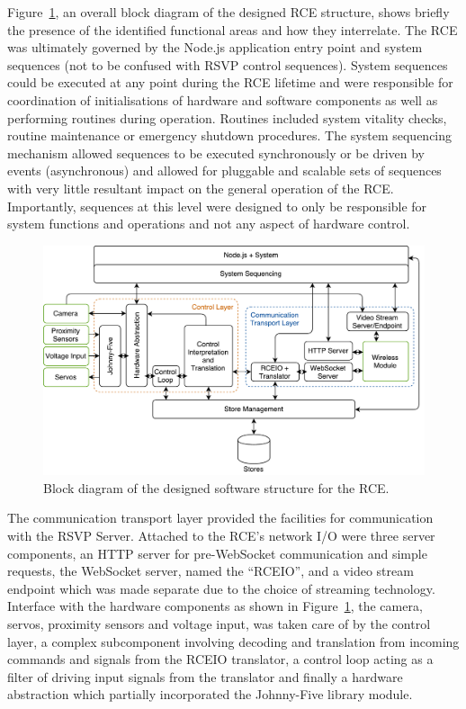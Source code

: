         Figure~\ref{fig:softDesign-rceStructurePlan}, an overall block diagram of the designed RCE structure, shows briefly the presence of the identified functional areas and how they interrelate. The RCE was ultimately governed by the Node.js application entry point and system sequences (not to be confused with RSVP control sequences). System sequences could be executed at any point during the RCE lifetime and were responsible for coordination of initialisations of hardware and software components as well as performing routines during operation. Routines included system vitality checks, routine maintenance or emergency shutdown procedures. The system sequencing mechanism allowed sequences to be executed synchronously or be driven by events (asynchronous) and allowed for pluggable and scalable sets of sequences with very little resultant impact on the general operation of the RCE. Importantly, sequences at this level were designed to only be responsible for system functions and operations and not any aspect of hardware control.
        
        \begin{figure}[h!]
          \centering
          \includegraphics[width=1\linewidth]{figures/softDesign-rceStructurePlan}
          \caption[Block diagram of the designed software structure for the RCE.]{Block diagram of the designed software structure for the RCE.}
          \label{fig:softDesign-rceStructurePlan}
        \end{figure}
        
        The communication transport layer provided the facilities for communication with the RSVP Server. Attached to the RCE's network I/O were three server components, an HTTP server for pre-WebSocket communication and simple requests, the WebSocket server, named the ``RCEIO'', and a video stream endpoint which was made separate due to the choice of streaming technology. Interface with the hardware components as shown in Figure~\ref{fig:softDesign-rceStructurePlan}, the camera, servos, proximity sensors and voltage input, was taken care of by the control layer, a complex subcomponent involving decoding and translation from incoming commands and signals from the RCEIO translator, a control loop acting as a filter of driving input signals from the translator and finally a hardware abstraction which partially incorporated the Johnny-Five library module.
        
